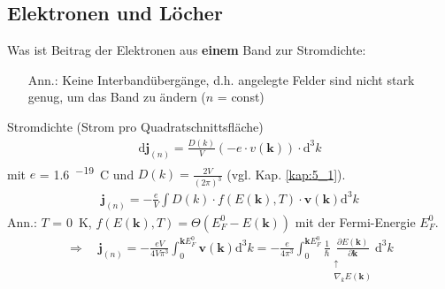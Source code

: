\subsection{Elektronen und Löcher} \label{sec:6_2}
Was ist Beitrag der Elektronen aus \textbf{einem} Band zur Stromdichte:
\begin{itemize}
    \item[Ann.:] Keine Interbandübergänge, d.h. angelegte Felder sind nicht stark genug, um das Band zu ändern ($n$ = const)
\end{itemize}
Stromdichte (Strom pro Quadratschnittsfläche)
\begin{align*}
    \mathrm{d}\textbf{j}_{(n)} = \frac{D(k)}{V} (-e \cdot v(\textbf{k})) \cdot \mathrm{d}^3k
\end{align*}
mit $e$ = \SI{1.6}{^{-19} C} und $D(k) = \frac{2V}{(2 \pi)^3}$ (vgl. Kap. \ref{kap:5_1}).
\begin{align*}
    \textbf{j}_{(n)} = -\frac{e}{V} \int D(k) \cdot f(E(\textbf{k}),T) \cdot \textbf{v}(\textbf{k}) \mathrm{d}^3k
\end{align*}
Ann.: $T$ = \SI{0}{K}, $f(E(\textbf{k}),T) = \Theta(E_F^0 - E(\textbf{k}))$ mit der Fermi-Energie $E_F^0$.
\begin{align*}
    \Rightarrow \quad \textbf{j}_{(n)} = - \frac{e V}{4V\pi^3} \int_0^{\textbf{k}E_F^0} \textbf{v}(\textbf{k}) \mathrm{d}^3k = - \frac{e}{4 \pi^3} \int_0^{\textbf{k}E_F^0} \frac{1}{\hbar} \underset{\begin{matrix}
        \uparrow \\
        \nabla_k E(\textbf{k})
    \end{matrix}}{\frac{\partial E (\textbf{k})}{\partial\textbf{k}}} \mathrm{d}^3k
\end{align*}

